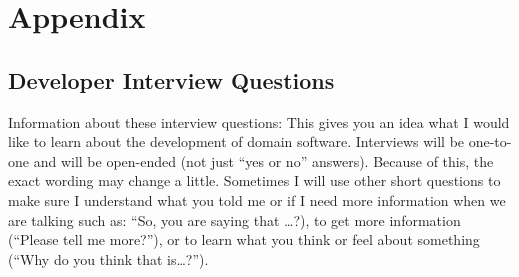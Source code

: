 \documentclass[12pt, notitlepage]{article}
\begin{document}
\section{Appendix}
\begin{singlespace}	

\subsection{Developer Interview Questions}\label{interviewquestions}

Information about these interview questions:  This gives you an idea what I would like to learn about the development of {domain} software. Interviews will be one-to-one and will be open-ended (not just “yes or no” answers). Because of this, the exact wording may change a little. Sometimes I will use other short questions to make sure I understand what you told me or if I need more information when we are talking such as: “So, you are saying that …?), to get more information (“Please tell me more?”), or to learn what you think or feel about something (“Why do you think that is…?”). 


\end{singlespace}
\end{document}
